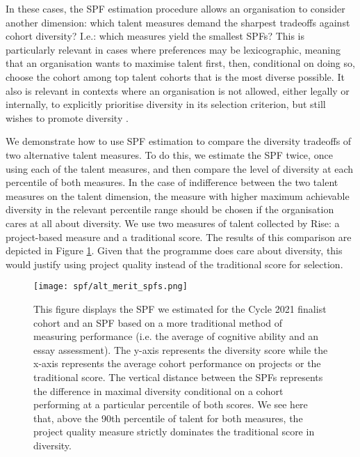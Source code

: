 In these cases, the SPF estimation procedure allows an organisation to consider another dimension: which talent measures demand the sharpest tradeoffs against cohort diversity? I.e.: which measures yield the smallest SPFs? This is particularly relevant in cases where preferences may be lexicographic, meaning that an organisation wants to maximise talent first, then, conditional on doing so, choose the cohort among top talent cohorts that is the most diverse possible. It also is relevant in contexts where an organisation is not allowed, either legally or internally, to explicitly prioritise diversity in its selection criterion, but still wishes to promote diversity \cite{Bleemer_2023}. 

We demonstrate how to use SPF estimation to compare the diversity tradeoffs of two alternative talent measures. To do this, we estimate the SPF twice, once using each of the talent measures, and then compare the level of diversity at each percentile of both measures. In the case of indifference between the two talent measures on the talent dimension, the measure with higher maximum achievable diversity in the relevant percentile range should be chosen if the organisation cares at all about diversity. We use two measures of talent collected by Rise: a project-based measure and a traditional score. The results of this comparison are depicted in Figure \ref{fig:compare_div_tradeoffs}. Given that the programme does care about diversity, this would justify using project quality instead of the traditional score for selection. 

\begin{figure}[htbp]
    \centering
    \texttt{[image: spf/alt\_merit\_spfs.png]} 
    \caption{This figure displays the SPF we estimated for the Cycle 2021 finalist cohort and an SPF based on a more traditional method of measuring performance (i.e. the average of cognitive ability and an essay assessment). The y-axis represents the diversity score while the x-axis represents the average cohort performance on projects or the traditional score. The vertical distance between the SPFs represents the difference in maximal diversity conditional on a cohort performing at a particular percentile of both scores. We see here that, above the 90th percentile of talent for both measures, the project quality measure strictly dominates the traditional score in diversity.}
    \label{fig:compare_div_tradeoffs}
\end{figure}
        
